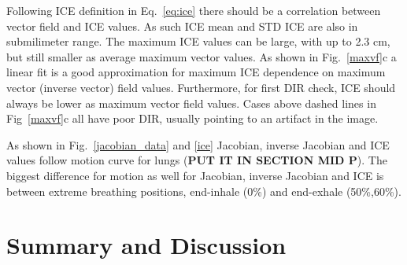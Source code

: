 \documentclass[type=dr, dr=rernat, accentcolor=tud7b,colorbacktitle, bigchapter, openright, twoside, 12pt ]{tudthesis}
\begin{document}
Following ICE definition in Eq.~\ref{eq:ice} there should be a correlation between vector field and ICE values. As such ICE mean and STD ICE are also in submilimeter range. The maximum ICE values can be large, with up to 2.3 cm, but still smaller as average maximum vector values. As shown in Fig.~\ref{maxvf}c a linear fit is a good approximation for maximum ICE dependence on maximum vector (inverse vector) field values. Furthermore, for first DIR check, ICE should always be lower as maximum vector field values. Cases above dashed lines in Fig~\ref{maxvf}c all have poor DIR, usually pointing to an artifact in the image.

As shown in Fig.~\ref{jacobian_data} and \ref{ice} Jacobian, inverse Jacobian and ICE values follow motion curve for lungs (\textbf{PUT IT IN SECTION MID P}). The biggest difference for motion as well for Jacobian, inverse Jacobian and ICE is between extreme breathing positions, end-inhale (0\%) and end-exhale (50\%,60\%). 




\section{Summary and Discussion}





{}
% 
\end{document}
